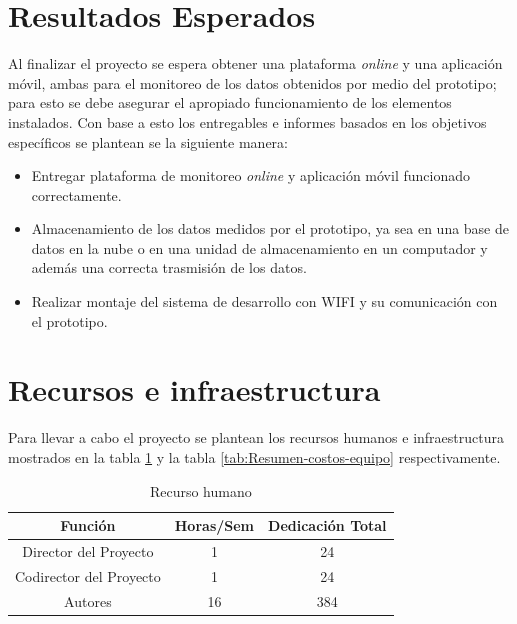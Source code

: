 \section{Resultados Esperados}

Al finalizar el proyecto se espera obtener una plataforma \textit{online} y una aplicación móvil, ambas para el monitoreo de los datos obtenidos por medio del prototipo; para esto se debe asegurar el apropiado funcionamiento de los elementos instalados. Con base a esto los entregables e informes basados en los objetivos específicos se plantean se la siguiente manera: 

\begin{itemize}
\item Entregar plataforma de monitoreo \textit{online} y aplicación móvil funcionado correctamente.

\item Almacenamiento de los datos medidos por el prototipo, ya sea en una base de datos en la nube o en una unidad de almacenamiento en un computador y además una correcta trasmisión de los datos.

\item Realizar montaje del sistema de desarrollo con WIFI y su comunicación con el prototipo.

\end{itemize}

\section{Recursos e infraestructura}

Para llevar a cabo el proyecto se plantean los recursos humanos e infraestructura mostrados en la tabla \ref{tab:Recurso-humano} y la tabla \ref{tab:Resumen-costos-equipo} respectivamente. 

\begin{table}[ht]
\caption{\label{tab:Recurso-humano} Recurso humano}
\begin{centering}
\begin{tabular}{|c||c||c|}
\hline 
Función  & Horas/Sem & Dedicación Total
\tabularnewline
\hline
\hline 
Director del Proyecto & 1 & 24 \tabularnewline %
\hline 
\hline
Codirector del Proyecto & 1 & 24 \tabularnewline %
\hline 
\hline
Autores & 16  & 384 \tabularnewline %
\hline
\hline
\end{tabular}
\par \end{centering}
\end{table}

